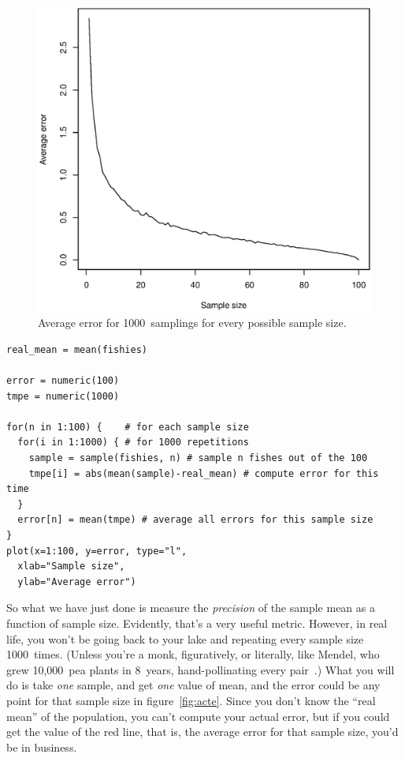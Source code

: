\documentclass{report}
\begin{document}
			\begin{figure}[h]
				\centering
				\includegraphics[width=1.0\textwidth]{avg_error.eps}
				\caption{Average error for 1000~samplings for every possible sample size.}
				\label{fig:avge}
			\end{figure}
			
			\begin{verbatim}
real_mean = mean(fishies)

error = numeric(100)
tmpe = numeric(1000)

for(n in 1:100) {    # for each sample size
  for(i in 1:1000) { # for 1000 repetitions
    sample = sample(fishies, n) # sample n fishes out of the 100
    tmpe[i] = abs(mean(sample)-real_mean) # compute error for this time
  }
  error[n] = mean(tmpe) # average all errors for this sample size
}
plot(x=1:100, y=error, type="l",
  xlab="Sample size",
  ylab="Average error")
			\end{verbatim}
			
			So what we have just done is measure the \emph{precision} of the sample mean as a function of sample size. Evidently, that's a very useful metric. However, in real life, you won't be going back to your lake and repeating every sample size 1000~times. (Unless you're a monk, figuratively, or literally, like Mendel, who grew 10,000~pea plants in 8~years, hand-pollinating every pair~\cite{mendel}.) What you will do is take \emph{one} sample, and get \emph{one} value of mean, and the error could be any point for that sample size in figure~\ref{fig:acte}. Since you don't know the ``real mean'' of the population, you can't compute your actual error, but if you could get the value of the red line, that is, the average error for that sample size, you'd be in business.
			
\end{document}
